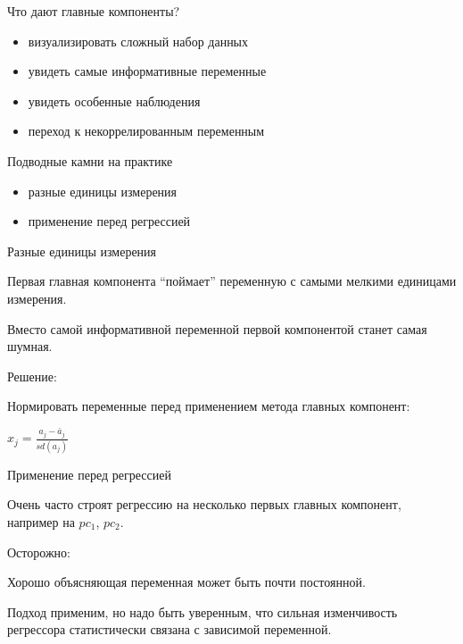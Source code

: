 \documentclass[ignorenonframetext,]{beamer}
\begin{document}
\begin{frame}{Что дают главные компоненты?}

\begin{itemize}
\itemsep1pt\parskip0pt
\item
  визуализировать сложный набор данных
\item
  увидеть самые информативные переменные
\item
  увидеть особенные наблюдения
\item
  переход к некоррелированным переменным
\end{itemize}

\end{frame}

\begin{frame}{Подводные камни на практике}

\begin{itemize}
\itemsep1pt\parskip0pt
\item
  разные единицы измерения
\item
  применение перед регрессией
\end{itemize}

\end{frame}

\begin{frame}{Разные единицы измерения}

Первая главная компонента ``поймает'' переменную с самыми мелкими
единицами измерения.

Вместо самой информативной переменной первой компонентой станет самая
шумная.

Решение:

Нормировать переменные перед применением метода главных компонент:

\(x_j=\frac{a_j-\bar{a}_j}{sd(a_j)}\)

\end{frame}

\begin{frame}{Применение перед регрессией}

Очень часто строят регрессию на несколько первых главных компонент,
например на \(pc_1\), \(pc_2\).

Осторожно:

Хорошо объясняющая переменная может быть почти постоянной.

Подход применим, но надо быть уверенным, что сильная изменчивость
регрессора статистически связана с зависимой переменной.

\end{frame}
\end{document}

